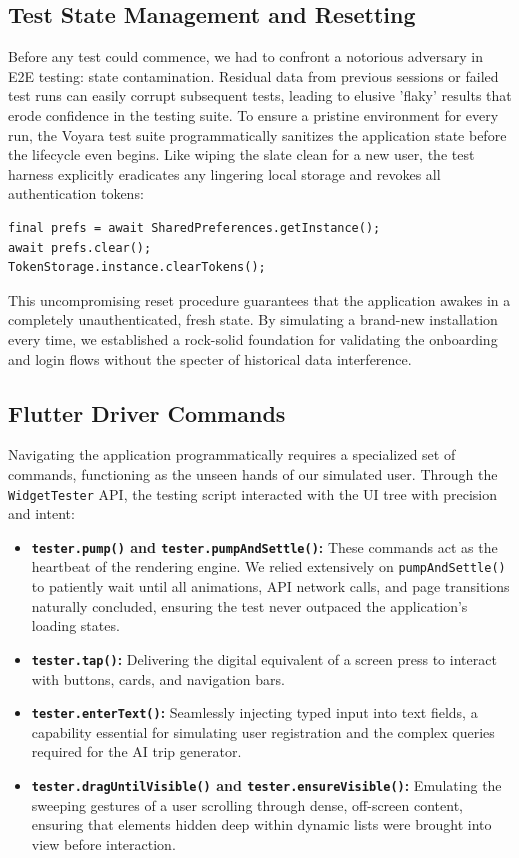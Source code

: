 \subsection{Test State Management and Resetting}
Before any test could commence, we had to confront a notorious adversary in E2E testing: state contamination. Residual data from previous sessions or failed test runs can easily corrupt subsequent tests, leading to elusive 'flaky' results that erode confidence in the testing suite. To ensure a pristine environment for every run, the Voyara test suite programmatically sanitizes the application state before the lifecycle even begins. Like wiping the slate clean for a new user, the test harness explicitly eradicates any lingering local storage and revokes all authentication tokens:
\begin{verbatim}
final prefs = await SharedPreferences.getInstance();
await prefs.clear();
TokenStorage.instance.clearTokens();
\end{verbatim}
This uncompromising reset procedure guarantees that the application awakes in a completely unauthenticated, fresh state. By simulating a brand-new installation every time, we established a rock-solid foundation for validating the onboarding and login flows without the specter of historical data interference.

\subsection{Flutter Driver Commands}
Navigating the application programmatically requires a specialized set of commands, functioning as the unseen hands of our simulated user. Through the \texttt{WidgetTester} API, the testing script interacted with the UI tree with precision and intent:
\begin{itemize}
    \item \textbf{\texttt{tester.pump()} and \texttt{tester.pumpAndSettle()}:} These commands act as the heartbeat of the rendering engine. We relied extensively on \texttt{pumpAndSettle()} to patiently wait until all animations, API network calls, and page transitions naturally concluded, ensuring the test never outpaced the application's loading states.
    \item \textbf{\texttt{tester.tap()}:} Delivering the digital equivalent of a screen press to interact with buttons, cards, and navigation bars.
    \item \textbf{\texttt{tester.enterText()}:} Seamlessly injecting typed input into text fields, a capability essential for simulating user registration and the complex queries required for the AI trip generator.
    \item \textbf{\texttt{tester.dragUntilVisible()} and \texttt{tester.ensureVisible()}:} Emulating the sweeping gestures of a user scrolling through dense, off-screen content, ensuring that elements hidden deep within dynamic lists were brought into view before interaction.
\end{itemize}

